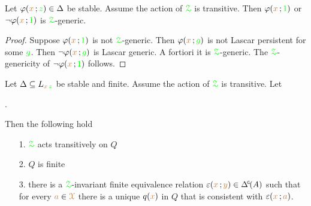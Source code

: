 \begin{corollary}\label{corol_genericornotgeneric}
  Let $\varphi({\color{brown} x}\,;{\color{green} z})\in\Delta$ be stable.
  Assume the action of ${\color{green}\EuScript Z}$ is transitive.
  Then $\varphi({\color{brown} x}\,;{\color{green} 1})$ or $\neg\varphi({\color{brown} x}\,;{\color{green} 1})$ is ${\color{green}\EuScript Z}$-generic.
\end{corollary}

\begin{proof}
  Suppose $\varphi({\color{brown} x}\,;{\color{green} 1})$ is not ${\color{green}\EuScript Z}$-generic.
  Then $\varphi({\color{brown} x}\,;{\color{green} g})$ is not Lascar persistent for some ${\color{green} g}$.
  Then $\neg\varphi({\color{brown} x}\,;{\color{green} g})$ is Lascar generic.
  A fortiori it is ${\color{green}\EuScript Z}$-generic.
  The ${\color{green}\EuScript Z}$-genericity of $\neg\varphi({\color{brown} x}\,;{\color{green} 1})$ follows.
\end{proof}

\begin{corollary}
  Let $\Delta\subseteq L_{{\color{brown} x}\,{\color{green} z}}$ be stable and finite.
  Assume the action of ${\color{green}\EuScript Z}$ is transitive.
  Let

  .
  
  Then the following hold
  \begin{itemize}
    \item [1.] ${\color{green}\EuScript Z}$ acts transitively on $Q$
    \item [2.] $Q$ is finite
    \item [3.] there is a ${\color{green}\EuScript Z}$-invariant finite equivalence relation $\epsilon({\mr x}\,;{\mr y})\in\GDelta(A)$ such that for every ${\color{brown} a}\in{\color{brown}\EuScript X}$ there is a unique $q({\color{brown} x})$ in $Q$ that is consistent with $\varepsilon({\color{brown} x}\,;{\color{brown} a})$.
  \end{itemize}
\end{corollary}

